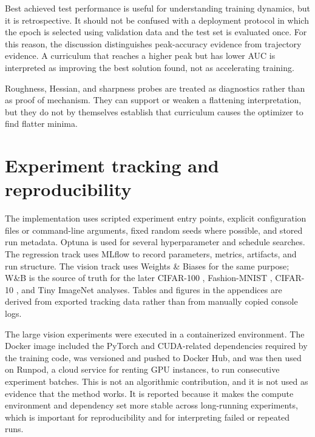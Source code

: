 \documentclass[english,master,a4paper,oneside]{ppfcmthesis}
\begin{document}
Best achieved test performance is useful for understanding training dynamics,
but it is retrospective. It should not be confused with a deployment protocol in
which the epoch is selected using validation data and the test set is evaluated
once. For this reason, the discussion distinguishes peak-accuracy evidence from
trajectory evidence. A curriculum that reaches a higher peak but has lower AUC is
interpreted as improving the best solution found, not as accelerating training.

Roughness, Hessian, and sharpness probes are treated as diagnostics rather than
as proof of mechanism. They can support or weaken a flattening interpretation,
but they do not by themselves establish that curriculum causes the optimizer to
find flatter minima.

\section{Experiment tracking and reproducibility}

The implementation uses scripted experiment entry points, explicit configuration
files or command-line arguments, fixed random seeds where possible, and stored
run metadata. Optuna \citep{akiba2019optuna} is used for several
hyperparameter and schedule searches. The regression track uses MLflow
\citep{zaharia2018accelerating} to record parameters, metrics, artifacts, and
run structure. The vision track uses Weights \& Biases \citep{biewald2020experiment}
for the same purpose; W\&B is the source of truth for the later CIFAR-100
\citep{krizhevsky2009learning}, Fashion-MNIST \citep{xiao2017fashion}, CIFAR-10
\citep{krizhevsky2009learning}, and Tiny ImageNet \citep{tinyimagenet,deng2009imagenet}
analyses. Tables and figures in the appendices are derived from exported
tracking data rather than from manually copied console logs.

The large vision experiments were executed in a containerized environment. The
Docker image included the PyTorch \citep{paszke2019pytorch} and CUDA-related
dependencies required by the training code, was versioned and pushed to Docker
Hub, and was then used on Runpod, a cloud service for renting GPU instances, to
run consecutive experiment batches. This is not an algorithmic contribution, and
it is not used as evidence that the method works. It is reported because it
makes the compute environment and dependency set more stable across long-running
experiments, which is important for reproducibility and for interpreting failed
or repeated runs.
\end{document}
